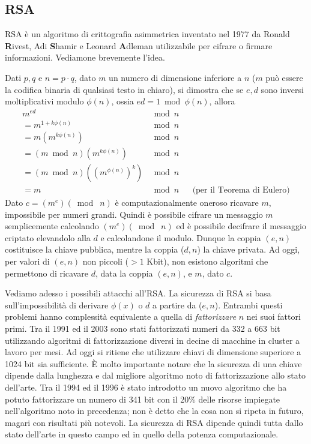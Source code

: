 \subsection{RSA}
RSA è un algoritmo di crittografia asimmetrica inventato nel 1977 da Ronald \textbf{R}ivest, Adi \textbf{S}hamir e Leonard \textbf{A}dleman utilizzabile per cifrare o firmare informazioni. Vediamone brevemente l'idea.

Dati $p, q$ e $n=p\cdot q$, dato $m$ un numero di dimensione inferiore a $n$ ($m$ può essere la codifica binaria di qualsiasi testo in chiaro), si dimostra che se $e, d$ sono inversi moltiplicativi modulo $\phi(n)$, ossia $ed=1\bmod\phi(n)$, allora
\begin{align*}
	m^{ed}&\bmod n && \\
	=m^{1+k\phi(n)}&\bmod n && \\
	=m(m^{k\phi(n)})&\bmod n && \\
	=(m\bmod n)(m^{k\phi(n)})&\bmod n && \\
	=(m\bmod n)((m^{\phi(n)})^k)&\bmod n && \\
	=m&\bmod n && \text{(per il Teorema di Eulero)}
\end{align*}
Dato $c=(m^e) (\bmod\;n)$ è computazionalmente oneroso ricavare $m$, impossibile per numeri grandi. Quindi è possibile cifrare un messaggio $m$ semplicemente calcolando $(m^e)(\bmod\; n)$ ed è possibile decifrare il messaggio criptato elevandolo alla $d$ e calcolandone il modulo. Dunque la coppia $(e, n)$ costituisce la chiave pubblica, mentre la coppia ($d, n$) la chiave privata. Ad oggi, per valori di $(e, n)$ non piccoli ($> 1$ Kbit), non esistono algoritmi che permettono di ricavare $d$, data la coppia $(e, n)$, e $m$, dato $c$.

Vediamo adesso i possibili attacchi all'RSA. La sicurezza di RSA si basa sull'impossibilità di derivare $\phi(x)$ o $d$ a partire da ($e, n$). Entrambi questi problemi hanno complessità equivalente a quella di \textit{fattorizzare} $n$ nei suoi fattori primi. Tra il 1991 ed il 2003 sono stati fattorizzati numeri da 332 a 663 bit utilizzando algoritmi di fattorizzazione diversi in decine di macchine in cluster a lavoro per mesi. Ad oggi si ritiene che utilizzare chiavi di dimensione superiore a 1024 bit sia sufficiente. È molto importante notare che la sicurezza di una chiave dipende dalla lunghezza e dal migliore algoritmo noto di fattorizzazione allo stato dell'arte. Tra il 1994 ed il 1996 è stato introdotto un nuovo algoritmo che ha potuto fattorizzare un numero di 341 bit con il 20\% delle risorse impiegate nell'algoritmo noto in precedenza; non è detto che la cosa non si ripeta in futuro, magari con risultati più notevoli. La sicurezza di RSA dipende quindi tutta dallo stato dell'arte in questo campo ed in quello della potenza computazionale.

